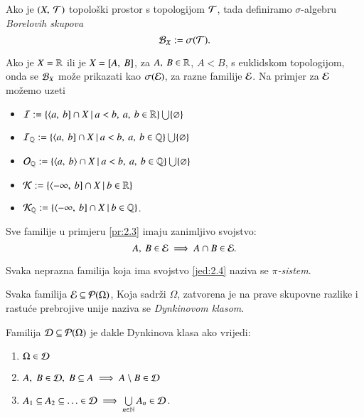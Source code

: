 \begin{defn}
    Ako je $(X, \: \mathcal{T})$ topolo\v ski prostor s topologijom $\mathcal{T}$, tada definiramo $\sigma$-algebru \emph{Borelovih skupova}
    \begin{equation*}
        \mathcal{B}_{X} := \sigma({\mathcal{T}}).
    \end{equation*}       
\end{defn}

\begin{pr}  \label{pr:2.3}
    Ako je $X = \mathbb{R}$ ili je $X = [{A}, \:{B}]$, za $A, \: B \in \mathbb{R}$, $A < B$, s euklidskom topologijom, onda se $\mathcal{B}_{X}$ mo\v ze prikazati kao $\sigma({\mathcal{E}})$, za razne familije $\mathcal{E}$.
    Na primjer za $\mathcal{E}$ mo\v zemo uzeti
    \begin{itemize}
        \item $\mathcal{I} := \{{\langle {a}, \: {b}] \cap X} \: | \: {a < b, \:
            a, \: b \in \mathbb{R}}\} \bigcup \{\varnothing\}$
        \item $\mathcal{I}_{\mathbb{Q}} := \{{\langle {a}, \: {b}] \cap X} \: | \: {a < b,
            \: a, \: b \in \mathbb{Q}}\} \bigcup \{ \varnothing \}$
        \item $\mathcal{O}_{\mathbb{Q}} := \{{\langle {a}, \: {b} \rangle \cap X} \: | \: {a < b,
            \: a, \: b \in \mathbb{Q}}\} \bigcup \{ \varnothing \}$
        \item $\mathcal{K} := \{{\langle {-\infty}, \: {b}] \cap X} \: | \: {b
            \in \mathbb{R}}\}$
        \item $\mathcal{K}_{\mathbb{Q}} := \{{\langle {-\infty}, \: {b}]
            \cap X} \: | \: {b \in \mathbb{Q}}\}$.
    \end{itemize}
\end{pr}

Sve familije u primjeru \ref{pr:2.3} imaju zanimljivo svojstvo:
\begin{equation}    \label{jed:2.4}
    A, \: B \in \mathcal{E} \implies A \cap B \in \mathcal{E}.
\end{equation}

Svaka neprazna familija koja ima svojstvo \eqref{jed:2.4} naziva se \emph{$\pi$-sistem}.

Svaka familija $\mathcal{E} \subseteq \mathcal{P}({\Omega})$, Koja sadr\v zi $\Omega$, zatvorena je na prave skupovne razlike i rastu\' ce prebrojive unije naziva se \emph{Dynkinovom klasom}.

\begin{nap} \label{nap:2.4-1}
    Familija $\mathcal{D} \subseteq \mathcal{P}({\Omega})$ je dakle Dynkinova klasa ako vrijedi:
    \begin{enumerate}[label=(\roman*)]
        \item   \label{nap:2.4-1.1}
        $\Omega \in \mathcal{D}$
        \item   \label{nap:2.4-1.2}
        $A, \; B \in \mathcal{D}, \; B \subseteq A \implies A \setminus B \in \mathcal{D}$
        \item $A_1 \subseteq A_2 \subseteq \ldots \in \mathcal{D} \implies \bigcup\limits_{n \in \mathbb{N}}^{} A_n \in \mathcal{D}$.
    \end{enumerate}
\end{nap}


